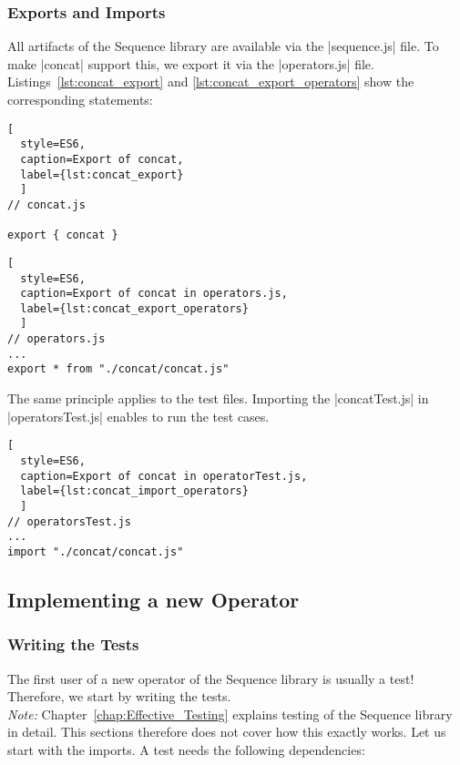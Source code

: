 \subsubsection{Exports and Imports}
\label{subsub:Exports and Imports}
All artifacts of the Sequence library are available via the |sequence.js| file.
To make |concat| support this, we export it via the |operators.js| file.
Listings~\ref{lst:concat_export} and \ref{lst:concat_export_operators} show the
corresponding statements:

\begin{lstlisting}[
  style=ES6, 
  caption=Export of concat,
  label={lst:concat_export}
  ]
// concat.js

export { concat }
\end{lstlisting}



\begin{lstlisting}[
  style=ES6, 
  caption=Export of concat in operators.js,
  label={lst:concat_export_operators}
  ]
// operators.js
...
export * from "./concat/concat.js"
\end{lstlisting}

The same principle applies to the test files. Importing the |concatTest.js| in
|operatorsTest.js| enables to run the test cases.

\begin{lstlisting}[
  style=ES6, 
  caption=Export of concat in operatorTest.js,
  label={lst:concat_import_operators}
  ]
// operatorsTest.js
...
import "./concat/concat.js"
\end{lstlisting}

\subsection{Implementing a new Operator}
\label{subsub:Implementing a new Operator}

\subsubsection{Writing the Tests}
\label{subsub:Write the Tests}
The first user of a new operator of the Sequence library is usually a test!
Therefore, we start by writing the tests.\\
\textit{Note:} Chapter~\ref{chap:Effective_Testing} explains testing of the
Sequence library in detail. This sections therefore does not cover how this
exactly works.
\newline
Let us start with the imports. A test needs the following dependencies:


